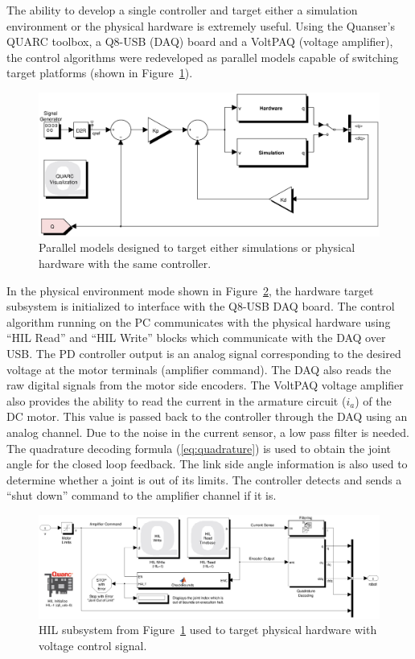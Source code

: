 The ability to develop a single controller and target either a simulation environment or the physical hardware is extremely useful. Using the Quanser's QUARC toolbox, a Q8-USB (DAQ) board and a VoltPAQ (voltage amplifier), the control algorithms were redeveloped as parallel models capable of switching target platforms (shown in Figure~\ref{fig:parallelmodels}).

\begin{figure}[!h]
	\centering
    \includegraphics[scale=0.6]{fig/experiments/parallelmodels.eps} 
  	\caption{Parallel models designed to target either simulations or physical hardware with the same controller.}
	\label{fig:parallelmodels}
\end{figure}

In the physical environment mode shown in Figure~\ref{fig:hilmodel}, the hardware target subsystem is initialized to interface with the Q8-USB DAQ board. The control algorithm running on the PC communicates with the physical hardware using ``HIL Read'' and ``HIL Write'' blocks which communicate with the DAQ over USB. The PD controller output is an analog signal corresponding to the desired voltage at the motor terminals (amplifier command). The DAQ also reads the raw digital signals from the motor side encoders. The VoltPAQ voltage amplifier also provides the ability to read the current in the armature circuit ($i_a$) of the DC motor. This value is passed back to the controller through the DAQ using an analog channel. Due to the noise in the current sensor, a low pass filter is needed. The quadrature decoding formula (\ref{eq:quadrature}) is used to obtain the joint angle for the closed loop feedback. The link side angle information is also used to determine whether a joint is out of its limits. The controller detects and sends a ``shut down'' command to the amplifier channel if it is. 

\begin{figure}[!h]
	\centering
    \includegraphics[scale=0.5]{fig/experiments/hilmodel.eps} 
  	\caption{HIL subsystem from Figure~\ref{fig:parallelmodels} used to target physical hardware with voltage control signal.}
	\label{fig:hilmodel}
\end{figure}

